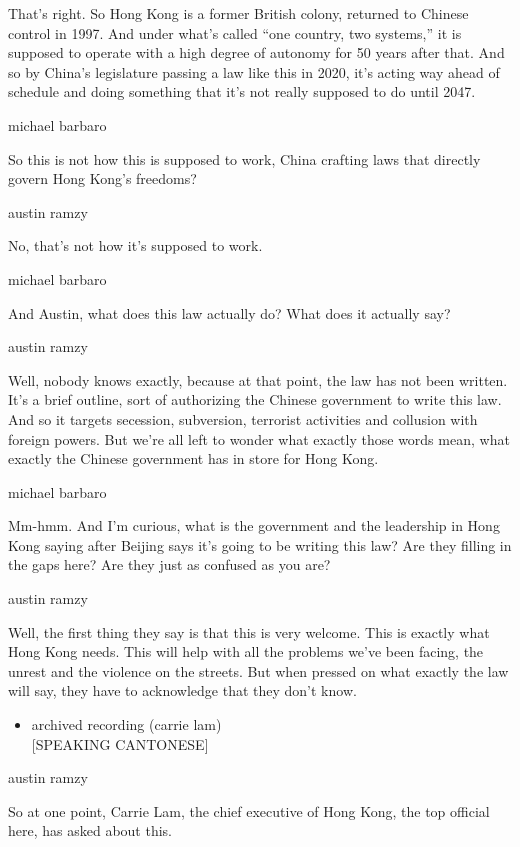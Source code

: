 That's right. So Hong Kong is a former British colony, returned to
Chinese control in 1997. And under what's called ``one country, two
systems,'' it is supposed to operate with a high degree of autonomy for
50 years after that. And so by China's legislature passing a law like
this in 2020, it's acting way ahead of schedule and doing something that
it's not really supposed to do until 2047.

michael barbaro

So this is not how this is supposed to work, China crafting laws that
directly govern Hong Kong's freedoms?

austin ramzy

No, that's not how it's supposed to work.

michael barbaro

And Austin, what does this law actually do? What does it actually say?

austin ramzy

Well, nobody knows exactly, because at that point, the law has not been
written. It's a brief outline, sort of authorizing the Chinese
government to write this law. And so it targets secession, subversion,
terrorist activities and collusion with foreign powers. But we're all
left to wonder what exactly those words mean, what exactly the Chinese
government has in store for Hong Kong.

michael barbaro

Mm-hmm. And I'm curious, what is the government and the leadership in
Hong Kong saying after Beijing says it's going to be writing this law?
Are they filling in the gaps here? Are they just as confused as you are?

austin ramzy

Well, the first thing they say is that this is very welcome. This is
exactly what Hong Kong needs. This will help with all the problems we've
been facing, the unrest and the violence on the streets. But when
pressed on what exactly the law will say, they have to acknowledge that
they don't know.

\begin{itemize}
\tightlist
\item
  archived recording (carrie lam)\\
  {[}SPEAKING CANTONESE{]}
\end{itemize}

austin ramzy

So at one point, Carrie Lam, the chief executive of Hong Kong, the top
official here, has asked about this.


